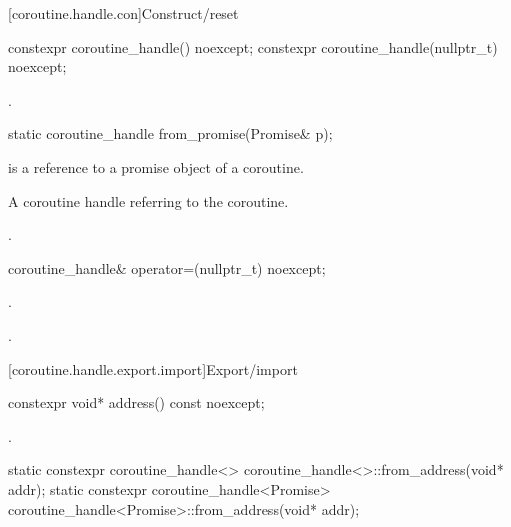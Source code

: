 [coroutine.handle.con]{Construct/reset}

%
\begin{itemdecl}
constexpr coroutine_handle() noexcept;
constexpr coroutine_handle(nullptr_t) noexcept;
\end{itemdecl}

\begin{itemdescr}
\pnum
\ensures {}.
\end{itemdescr}

%
\begin{itemdecl}
static coroutine_handle from_promise(Promise& p);
\end{itemdecl}

\begin{itemdescr}
\pnum
\requires {} is a reference to a promise object of a coroutine.

\pnum
\returns A coroutine handle  referring to the coroutine.

\pnum
\ensures {}.
\end{itemdescr}

%
\begin{itemdecl}
coroutine_handle& operator=(nullptr_t) noexcept;
\end{itemdecl}

\begin{itemdescr}
\pnum
\ensures {}.

\pnum
\returns {}.
\end{itemdescr}

[coroutine.handle.export.import]{Export/import}

%
\begin{itemdecl}
constexpr void* address() const noexcept;
\end{itemdecl}

\begin{itemdescr}
\pnum
\returns {}.
\end{itemdescr}

%
\begin{itemdecl}
static constexpr coroutine_handle<> coroutine_handle<>::from_address(void* addr);
static constexpr coroutine_handle<Promise> coroutine_handle<Promise>::from_address(void* addr);
\end{itemdecl}

